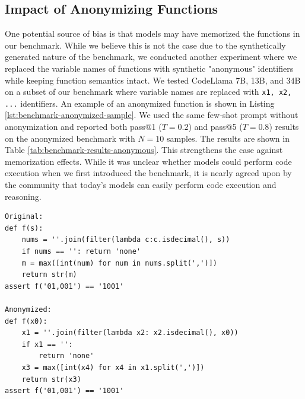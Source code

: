 \subsection{Impact of Anonymizing Functions} \label{sec:cruxeval-anonymization}
One potential source of bias is that models may have memorized the functions in our benchmark.
While we believe this is not the case due to the synthetically generated nature of the benchmark, we
conducted another experiment where we replaced the variable names of functions with synthetic "anonymous"
identifiers while keeping function semantics intact. We tested CodeLlama 7B, 13B, and 34B on a subset of our benchmark
where variable names are replaced with \texttt{x1, x2, ...} identifiers. An example of an anonymized function is shown
in Listing \ref{lst:benchmark-anonymized-sample}. We used the same few-shot prompt
without anonymization and reported both pass@1 ($T=0.2$) and pass@5 ($T=0.8$) results
on the anonymized benchmark with $N=10$ samples. The results are shown in
Table \ref{tab:benchmark-results-anonymous}. This strengthens the case against
memorization effects. While it was unclear whether models could perform code execution
when we first introduced the benchmark, it is nearly agreed upon by the community that
today's models can easily perform code execution and reasoning.

\begin{lstlisting}[caption={Sample of benchmark and anonymized version},label={lst:benchmark-anonymized-sample}, captionpos=t, breaklines=true]
Original:
def f(s):
    nums = ''.join(filter(lambda c:c.isdecimal(), s))
    if nums == '': return 'none'
    m = max([int(num) for num in nums.split(',')])
    return str(m)
assert f('01,001') == '1001'

Anonymized:
def f(x0):
    x1 = ''.join(filter(lambda x2: x2.isdecimal(), x0))
    if x1 == '':
        return 'none'
    x3 = max([int(x4) for x4 in x1.split(',')])
    return str(x3)
assert f('01,001') == '1001'
\end{lstlisting}

